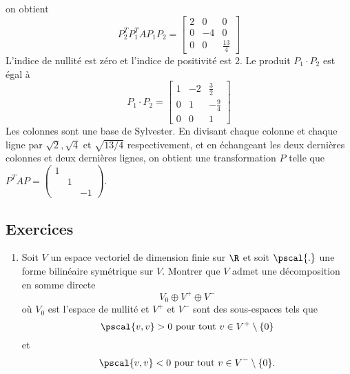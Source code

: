 \begin{example}
\begin{displaymath}
\end{displaymath}
on obtient 
\begin{displaymath}
  P_2^TP_1^T A P_1 P_2 = \left[\begin{matrix}2 & 0 & 0\\0 & -4 & 0\\0 & 0 & \frac{13}{4} \end{matrix}\right]
\end{displaymath}
L'indice de nullité est zéro et l'indice de positivité est $2$. Le produit $P_1\cdot P_2$ est égal à 
\begin{displaymath}
  P_1 \cdot P_2 = \left[\begin{matrix}1 & -2 & \frac{3}{2}\\0 & 1 & -\frac{9}{4}\\0 & 0 & 1\end{matrix}\right]
\end{displaymath}
Les colonnes sont une base de Sylvester. En divisant chaque colonne et chaque ligne par $\sqrt{2},\sqrt{4}$ et $\sqrt{13/4}$ respectivement, et en échangeant les deux dernières colonnes et deux dernières lignes, on obtient une transformation $P$ telle que $P^TAP =
\begin{pmatrix}
  1& \\
  & 1 & \\
  & & -1
\end{pmatrix}$. 
\end{example}



\subsection*{Exercices} 

\begin{enumerate}
\item Soit $V$ un espace vectoriel de dimension finie sur $\R$ et soit $\pscal{.}$ une forme bilinéaire symétrique  sur $V$.  Montrer que $V$ admet une décomposition en somme directe 
  \begin{displaymath}
    V_0 \oplus V^+ \oplus V^-
  \end{displaymath}
où $V_0$ est l'espace de nullité et $V^+$ et $V^-$ sont des sous-espaces tels que 
\begin{displaymath}
  \pscal{v,v} >0 \text{ pour tout } v \in V^+ \setminus\{0\}
\end{displaymath}
et  
\begin{displaymath}
  \pscal{v,v} <0 \text{ pour tout } v \in V^- \setminus\{0\}. 
\end{displaymath}
\end{enumerate}







